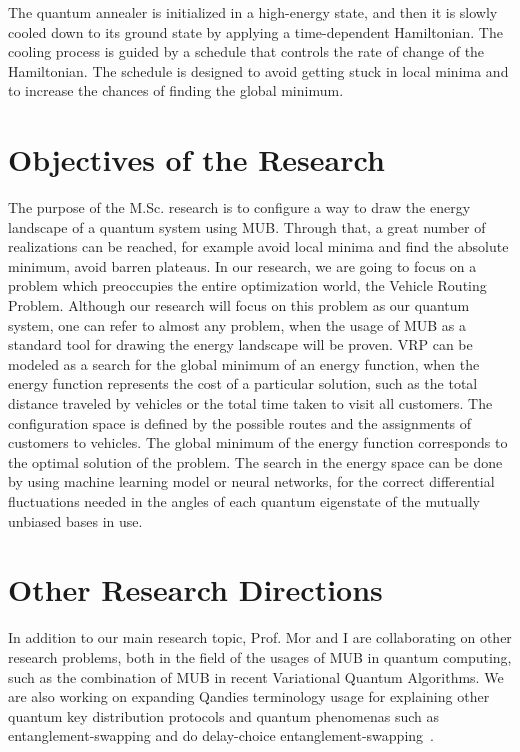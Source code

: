 \documentclass[12pt, a4paper]{article}
\begin{document}
    The quantum annealer is initialized in a high-energy state,
    and then it is slowly cooled down to its ground state by applying a time-dependent Hamiltonian.
    The cooling process is guided by a schedule that controls the rate of change of the Hamiltonian.
    The schedule is designed to avoid getting stuck in local minima and to increase the chances of finding the global minimum.


    \section{Objectives of the Research}\label{sec:objectives-of-the-research}
    The purpose of the M.Sc. research is to configure a way to draw the energy landscape of a quantum system using MUB.
    Through that, a great number of realizations can be reached, for example avoid local minima and find the absolute minimum, avoid barren plateaus\@.
    In our research, we are going to focus on a problem which preoccupies the entire optimization world, the Vehicle Routing Problem.
    Although our research will focus on this problem as our quantum system, one can refer to almost any problem, when the usage of MUB as
    a standard tool for drawing the energy landscape will be proven.
    VRP can be modeled as a search for the global minimum of an energy function, when the energy function represents
    the cost of a particular solution, such as the total distance traveled by vehicles or the total time taken to visit
    all customers.
    The configuration space is defined by the possible routes and the assignments of customers to vehicles.
    The global minimum of the energy function corresponds to the optimal solution of the problem\@.
    The search in the energy space can be done by using machine learning model or neural networks, for the correct differential
    fluctuations needed in the angles of each quantum eigenstate of the mutually unbiased bases in use.

    \section{Other Research Directions}\label{sec:other-research-directions}
    In addition to our main research topic, Prof. Mor and I are collaborating on other research problems, both in the field
    of the usages of MUB in quantum computing, such as the combination of MUB in recent Variational Quantum Algorithms.
    We are also working on expanding Qandies \cite{lin2021quantum} \cite{lin2020quantum} \cite{mor2022digital} terminology usage for explaining other quantum key distribution protocols and quantum phenomenas such as
    entanglement-swapping and do delay-choice entanglement-swapping~\cite{ma2016delayed}.

    
    
\end{document}
